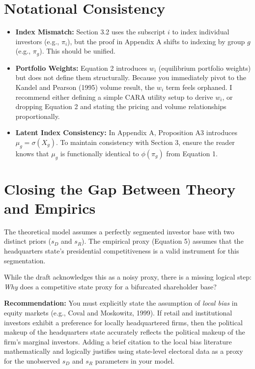 \documentclass[12pt]{article}
\begin{document}
\section{Notational Consistency}

\begin{itemize}
    \item \textbf{Index Mismatch:} Section 3.2 uses the subscript $i$ to index individual investors (e.g., $\pi_i$), but the proof in Appendix A shifts to indexing by group $g$ (e.g., $\pi_g$). This should be unified. 
    \item \textbf{Portfolio Weights:} Equation 2 introduces $w_i$ (equilibrium portfolio weights) but does not define them structurally. Because you immediately pivot to the Kandel and Pearson (1995) volume result, the $w_i$ term feels orphaned. I recommend either defining a simple CARA utility setup to derive $w_i$, or dropping Equation 2 and stating the pricing and volume relationships proportionally.
    \item \textbf{Latent Index Consistency:} In Appendix A, Proposition A3 introduces $\mu_g = \sigma(X_g)$. To maintain consistency with Section 3, ensure the reader knows that $\mu_g$ is functionally identical to $\phi(\pi_g)$ from Equation 1.
\end{itemize}

\section{Closing the Gap Between Theory and Empirics}

The theoretical model assumes a perfectly segmented investor base with two distinct priors ($s_D$ and $s_R$). The empirical proxy (Equation 5) assumes that the headquarters state's presidential competitiveness is a valid instrument for this segmentation. 

While the draft acknowledges this as a noisy proxy, there is a missing logical step: \textit{Why} does a competitive state proxy for a bifurcated shareholder base? 

\textbf{Recommendation:} You must explicitly state the assumption of \textit{local bias} in equity markets (e.g., Coval and Moskowitz, 1999). If retail and institutional investors exhibit a preference for locally headquartered firms, then the political makeup of the headquarters state accurately reflects the political makeup of the firm's marginal investors. Adding a brief citation to the local bias literature mathematically and logically justifies using state-level electoral data as a proxy for the unobserved $s_D$ and $s_R$ parameters in your model.
\end{document}
